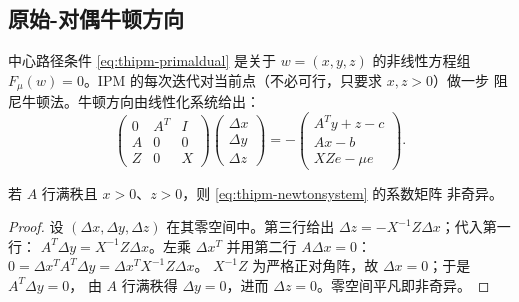\subsection{原始-对偶牛顿方向}\label{subsec:thipm-newton}

中心路径条件 \eqref{eq:thipm-primaldual} 是关于 $w=(x,y,z)$ 的非线性方程组
$F_\mu(w)=0$。IPM 的每次迭代对当前点（不必可行，只要求 $x,z>0$）做一步
阻尼牛顿法。牛顿方向由线性化系统给出：
\begin{equation}\label{eq:thipm-newtonsystem}
  \begin{pmatrix}
    0 & A^{T} & I\\
    A & 0 & 0\\
    Z & 0 & X
  \end{pmatrix}
  \begin{pmatrix}\Delta x\\ \Delta y\\ \Delta z\end{pmatrix}
  =-
  \begin{pmatrix}
    A^{T}y+z-c\\ Ax-b\\ XZe-\mu e
  \end{pmatrix}.
\end{equation}

\begin{lemma}[牛顿系统的可解性]\label{lem:thipm-nonsingular}
若 $A$ 行满秩且 $x>0$、$z>0$，则 \eqref{eq:thipm-newtonsystem} 的系数矩阵
非奇异。
\end{lemma}

\begin{proof}
设 $(\Delta x,\Delta y,\Delta z)$ 在其零空间中。第三行给出
$\Delta z=-X^{-1}Z\Delta x$；代入第一行：
$A^{T}\Delta y=X^{-1}Z\Delta x$。左乘 $\Delta x^{T}$ 并用第二行
$A\Delta x=0$：
$0=\Delta x^{T}A^{T}\Delta y=\Delta x^{T}X^{-1}Z\Delta x$。
$X^{-1}Z$ 为严格正对角阵，故 $\Delta x=0$；于是 $A^{T}\Delta y=0$，
由 $A$ 行满秩得 $\Delta y=0$，进而 $\Delta z=0$。零空间平凡即非奇异。
\end{proof}

